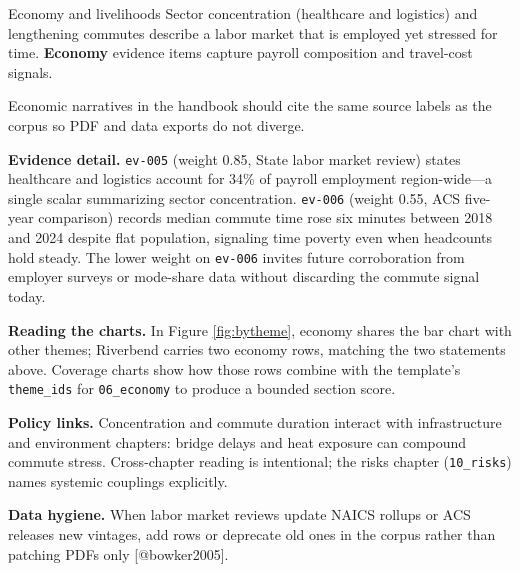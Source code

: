 \documentclass[
  ignorenonframetext,
]{beamer}
\author{\texorpdfstring{}{}}
\date{}
\begin{document}
\begin{frame}[fragile]{Economy and livelihoods}
\protect{}\label{economy-and-livelihoods}
Sector concentration (healthcare and logistics) and lengthening commutes
describe a labor market that is employed yet stressed for time.
\textbf{Economy} evidence items capture payroll composition and
travel-cost signals.

Economic narratives in the handbook should cite the same source labels
as the corpus so PDF and data exports do not diverge.

\textbf{Evidence detail.} \texttt{ev-005} (weight 0.85, State labor
market review) states healthcare and logistics account for 34\% of
payroll employment region-wide---a single scalar summarizing sector
concentration. \texttt{ev-006} (weight 0.55, ACS five-year comparison)
records median commute time rose six minutes between 2018 and 2024
despite flat population, signaling time poverty even when headcounts
hold steady. The lower weight on \texttt{ev-006} invites future
corroboration from employer surveys or mode-share data without
discarding the commute signal today.

\textbf{Reading the charts.} In Figure \ref{fig:bytheme}, economy shares
the bar chart with other themes; Riverbend carries two economy rows,
matching the two statements above. Coverage charts show how those rows
combine with the template's \texttt{theme\_ids} for \texttt{06\_economy}
to produce a bounded section score.

\textbf{Policy links.} Concentration and commute duration interact with
infrastructure and environment chapters: bridge delays and heat exposure
can compound commute stress. Cross-chapter reading is intentional; the
risks chapter (\texttt{10\_risks}) names systemic couplings explicitly.

\textbf{Data hygiene.} When labor market reviews update NAICS rollups or
ACS releases new vintages, add rows or deprecate old ones in the corpus
rather than patching PDFs only {[}@bowker2005{]}.
\end{frame}
\end{document}
